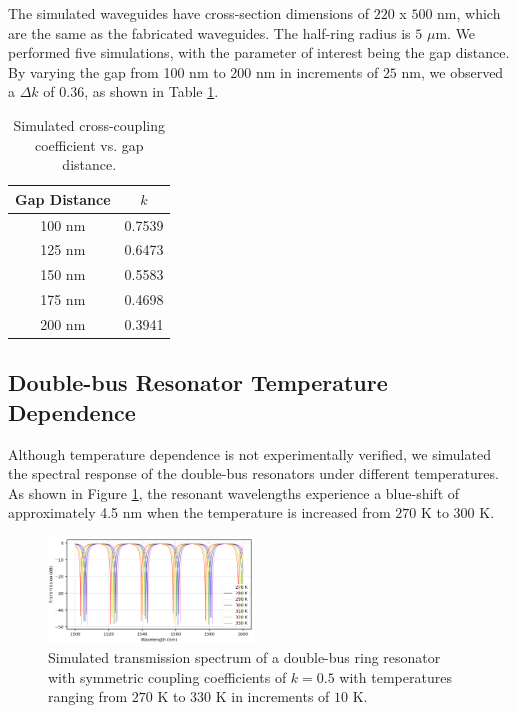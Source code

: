 \documentclass[letterpaper, 10 pt, conference]{ieeeconf}
\begin{document}
The simulated waveguides have cross-section dimensions of $220$ x $500$ nm, which are the same as the fabricated waveguides. The half-ring radius is $5$ $\mu$m. We performed five simulations, with the parameter of interest being the gap distance. By varying the gap from 100 nm to 200 nm in increments of $25$ nm, we observed a $\Delta k$ of $0.36$, as shown in Table \ref{tab:sim}. 

\begin{table}[!ht]
\centering
\caption{Simulated cross-coupling coefficient vs. gap distance.}
\begin{tabular}{|c|c|}
\hline
\textbf{Gap Distance} & \textbf{$k$} \\ \hline
100 nm & 0.7539 \\ \hline
125 nm & 0.6473 \\ \hline
150 nm & 0.5583 \\ \hline
175 nm & 0.4698 \\ \hline
200 nm & 0.3941 \\ \hline
\end{tabular}
\label{tab:sim}
\end{table}



\subsection*{Double-bus Resonator Temperature Dependence} 
Although temperature dependence is not experimentally verified, we simulated the spectral response of the double-bus resonators under different temperatures. As shown in Figure \ref{fig:temp}, the resonant wavelengths experience a blue-shift of approximately 4.5 nm when the temperature is increased from $270$ K to $300$ K.

\begin{figure}[!ht]
    \centering
    \includegraphics[width = 0.485\textwidth]{Temp_dependence.png}
    \caption{Simulated transmission spectrum of a double-bus ring resonator with symmetric coupling coefficients of $k = 0.5$ with temperatures ranging from $270$ K to $330$ K in increments of $10$ K.}
    \label{fig:temp}
\end{figure} 
\end{document}
